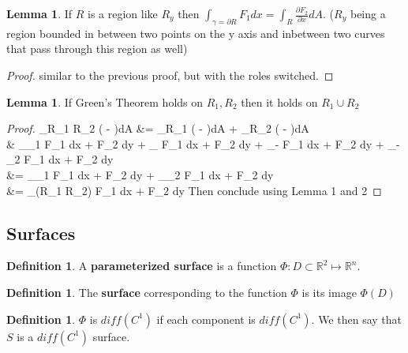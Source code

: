 \documentclass[12pt]{article}
\theoremstyle{plain}
\theoremstyle{definition}
\newtheorem{definition}[theorem]{Definition}
\newtheorem{lemma}[theorem]{Lemma}
\begin{document}
\begin{lemma}
	If $R$ is a region like $R_y$ then $\int_{\gamma = \partial R} F_1 dx = \int_R \frac{\partial F_2}{\partial x} dA$. ($R_y$ being a region bounded in between two points on the y axis and inbetween two curves that pass through this region as well)
\end{lemma}

\begin{proof}
	similar to the previous proof, but with the roles switched.
\end{proof}

\begin{lemma}
	If Green's Theorem holds on $R_1, R_2$ then it holds on $R_1 \cup R_2$
\end{lemma}

\begin{proof}
	\int_{R_1 \cup R_2} ( - )dA &= \int_{R_1} ( - )dA + \int_{R_2} ( - )dA\\
	& \int_{\gamma_1} F_1 dx + F_2 dy + \int_{\sigma} F_1 dx + F_2 dy + \int_{-\sigma} F_1 dx + F_2 dy + \int_{-\gamma_2} F_1 dx + F_2 dy\\
	&= \int_{\gamma_1} F_1 dx + F_2 dy + \int_{\gamma_2} F_1 dx + F_2 dy\\
	&= \int_{\partial (R_1 \cup R_2)} F_1 dx + F_2 dy
	Then conclude using Lemma 1 and 2
\end{proof}

\subsection{Surfaces}

\begin{definition}
	A \textbf{parameterized surface} is a function $\Phi : D \subset \mathbb{R}^2 \mapsto \mathbb{R}^n$.
\end{definition}

\begin{definition}
	The \textbf{surface} corresponding to the function $\Phi$ is its image $\Phi (D)$
\end{definition}

\begin{definition}
	$\Phi$ is $diff(C^1)$ if each component is $diff(C^1)$. We then say that $S$ is a $diff(C^1)$ surface.
\end{definition}
\end{document}
